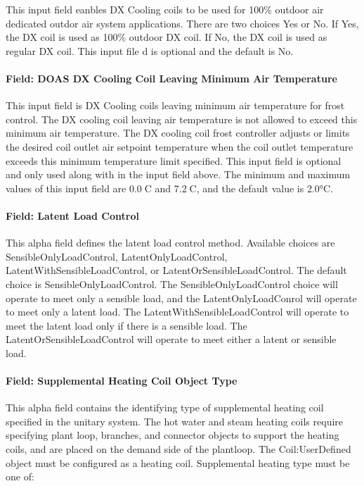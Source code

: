 This input field eanbles DX Cooling coils to be used for 100\% outdoor air dedicated outdor air system applications. There are two choices Yes or No. If Yes, the DX coil is used as 100\% outdoor DX coil. If No, the DX coil is used as regular DX coil. This input file d is optional and the default is No.

\paragraph{Field: DOAS DX Cooling Coil Leaving Minimum Air Temperature}\label{field-doas-dx-cooling-coil-leaving-minimum-air-temperature}

This input field is DX Cooling coils leaving minimum air temperature for frost control. The DX cooling coil leaving air temperature is not allowed to exceed this minimum air temperature. The DX cooling coil frost controller adjusts or limits the desired coil outlet air setpoint temperature when the coil outlet temperature exceeds this minimum temperature limit specified. This input field is optional and only used along with in the input field above. The minimum and maximum values of this input field are 0.0C and 7.2C, and the default value is 2.0°C.

\paragraph{Field: Latent Load Control}\label{field-latent-load-control}

This alpha field defines the latent load control method. Available choices are SensibleOnlyLoadControl, LatentOnlyLoadControl, LatentWithSensibleLoadControl, or LatentOrSensibleLoadControl. The default choice is SensibleOnlyLoadControl. The SensibleOnlyLoadControl choice will operate to meet only a sensible load, and the LatentOnlyLoadConrol will operate to meet only a latent load. The LatentWithSensibleLoadControl will operate to meet the latent load only if there is a sensible load. The LatentOrSensibleLoadControl will operate to meet either a latent or sensible load.

\paragraph{Field: Supplemental Heating Coil Object Type}\label{field-supplemental-heating-coil-object-type}

This alpha field contains the identifying type of supplemental heating coil specified in the unitary system. The hot water and steam heating coils require specifying plant loop, branches, and connector objects to support the heating coils, and are placed on the demand side of the plantloop. The Coil:UserDefined object must be configured as a heating coil. Supplemental heating type must be one of:

